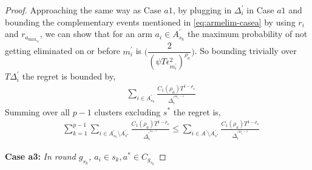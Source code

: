 \begin{proof}
Approaching the same way as Case $a1$, by plugging in $\Delta^{'}_{i}$ in Case $a1$ and bounding the complementary events mentioned in \ref{eq:armelim-casea} by using $r_{i}$ and $r_{a_{\max_{s_{k}}}}$, we can show that for an arm $a_{i}\in A_{s_{k}}^{'}$ the maximum probability of not getting eliminated on or before $m_{i}^{'}$ is  $\bigg(\dfrac{2}{(\psi T\epsilon_{m_{i}^{'}}^{2})^{\rho_{a}}}\bigg)$. So bounding trivially over $T\Delta_{i}^{'}$ the regret is bounded by,
\begin{align*}
& \sum_{i\in A_{s_{k}}^{'}}\frac{C_{1}(\rho_{a})T^{1-\rho_{a}}}{\Delta_{i}^{'^{{4\rho_{a}-1}}}} 
   \end{align*}
Summing over all $p-1$ clusters excluding $s^{*}$ the regret is,
\begin{align*}
& \sum_{k=1}^{p-1}\sum_{i\in A_{s_{k}}^{'}\setminus A_{s^{*}}^{'}} \frac{C_{1}(\rho_{a})T^{1-\rho_{a}}}{\Delta_{i}^{'^{^{4\rho_{a}-1}}}} \leq \sum_{i\in A^{'}\setminus A^{'}_{s^{*}}}\frac{C_{1}(\rho_{a})T^{1-\rho_{a}}}{\Delta_{i}^{'^{4\rho_{a}-1}}} 
   \end{align*}
   




\textbf{Case a3:} \textit{In round $g_{s_{k}}$, $a_{i}\in s_{k}, a^{*}\in C_{g_{s_{k}}}$} 


\end{proof}
